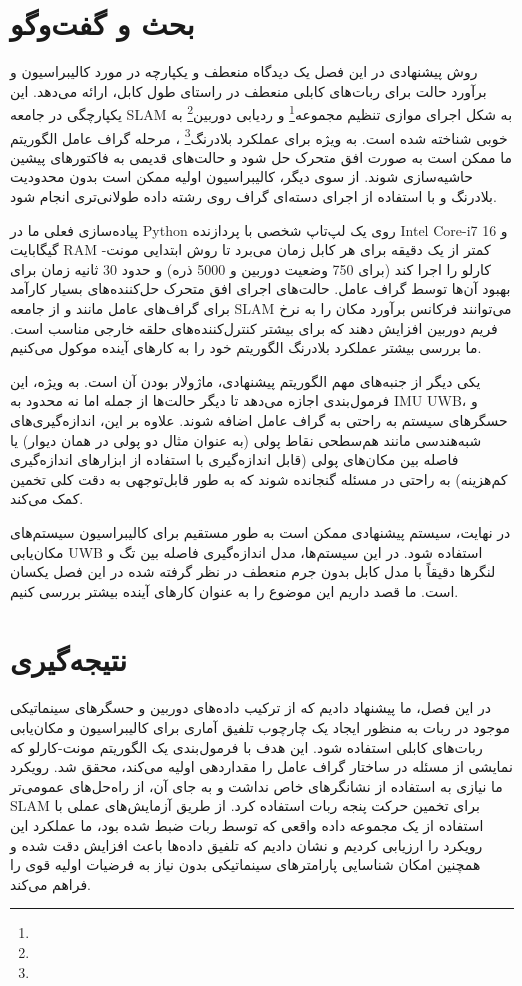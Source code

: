 \section{بحث و گفت‌وگو}
روش پیشنهادی در این فصل یک دیدگاه منعطف و یکپارچه در مورد کالیبراسیون و برآورد حالت برای ربات‌های کابلی منعطف در راستای طول کابل، ارائه می‌دهد. این یکپارچگی در جامعه SLAM به شکل اجرای موازی تنظیم مجموعه\footnote{}
 و ردیابی دوربین\footnote{}
 به خوبی شناخته شده است. به ویژه برای عملکرد بلادرنگ\footnote{}
 ، مرحله گراف عامل الگوریتم ما ممکن است به صورت افق متحرک حل شود و حالت‌های قدیمی به فاکتورهای پیشین حاشیه‌سازی شوند. از سوی دیگر، کالیبراسیون اولیه ممکن است بدون محدودیت بلادرنگ و با استفاده از اجرای دسته‌ای گراف روی رشته داده طولانی‌تری انجام شود.

پیاده‌سازی فعلی ما در Python روی یک لپ‌تاپ شخصی با پردازنده Intel Core-i7 و 16 گیگابایت RAM کمتر از یک دقیقه برای هر کابل زمان می‌برد تا روش ابتدایی مونت-کارلو را اجرا کند (برای 750 وضعیت دوربین و 5000 ذره) و حدود 30 ثانیه زمان برای بهبود آن‌ها توسط گراف عامل. حالت‌های اجرای افق متحرک حل‌کننده‌های بسیار کارآمد برای گراف‌های عامل مانند 
\cite{dellaert2012factor} و \cite{martiros2022symforce}
 از جامعه SLAM می‌توانند فرکانس برآورد مکان را به نرخ فریم دوربین افزایش دهند که برای بیشتر کنترل‌کننده‌های حلقه خارجی مناسب است. ما بررسی بیشتر عملکرد بلادرنگ الگوریتم خود را به کارهای آینده موکول می‌کنیم.

یکی دیگر از جنبه‌های مهم الگوریتم پیشنهادی، ماژولار بودن آن است. به ویژه، این فرمول‌بندی اجازه می‌دهد تا دیگر حالت‌ها از جمله اما نه محدود به IMU UWB، و حسگرهای سیستم به راحتی به گراف عامل اضافه شوند. علاوه بر این، اندازه‌گیری‌های شبه‌هندسی مانند هم‌سطحی نقاط پولی (به عنوان مثال دو پولی در همان دیوار) یا فاصله بین مکان‌های پولی (قابل اندازه‌گیری با استفاده از ابزارهای اندازه‌گیری کم‌هزینه) به راحتی در مسئله گنجانده ‌شوند که به طور قابل‌توجهی به دقت کلی تخمین کمک می‌کند.

در نهایت، سیستم پیشنهادی ممکن است به طور مستقیم برای کالیبراسیون سیستم‌های مکان‌یابی UWB استفاده شود. در این سیستم‌ها، مدل اندازه‌گیری فاصله بین تگ و لنگرها دقیقاً با مدل کابل بدون جرم منعطف در نظر گرفته شده در این فصل یکسان است. ما قصد داریم این موضوع را به عنوان کارهای آینده بیشتر بررسی کنیم.


\section{نتیجه‌گیری}

در این فصل، ما پیشنهاد دادیم که از ترکیب داده‌های دوربین و حسگرهای سینماتیکی موجود در ربات به منظور ایجاد یک چارچوب تلفیق آماری برای کالیبراسیون و مکان‌یابی ربات‌های کابلی استفاده شود. این هدف با فرمول‌بندی یک الگوریتم مونت-کارلو که نمایشی از مسئله در ساختار گراف عامل را مقداردهی اولیه می‌کند، محقق شد. رویکرد ما نیازی به استفاده از نشانگرهای خاص نداشت و به جای آن، از راه‌حل‌های عمومی‌تر SLAM برای تخمین حرکت پنجه ربات استفاده کرد. از طریق آزمایش‌های عملی با استفاده از یک مجموعه داده واقعی که توسط ربات  ضبط شده بود، ما عملکرد این رویکرد را ارزیابی کردیم و نشان دادیم که تلفیق داده‌ها باعث افزایش دقت شده و همچنین امکان شناسایی پارامترهای سینماتیکی بدون نیاز به فرضیات اولیه قوی را فراهم می‌کند. 

